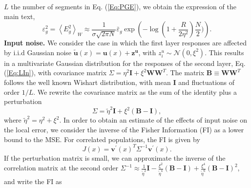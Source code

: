 \documentclass[a4paper]{article}%
\begin{document}
$L$ the number of segments in Eq. (\ref{Eq:PGE}), we obtain the expression of
the main text,
\begin{equation}
\varepsilon_{g}^{2} = \left\langle E_{g}^{2}\right\rangle _{W} \approx\frac{1
}{\sigma\sqrt{2\pi N}}\bar{\varepsilon}_{g} \exp{\left(  -\log\left(  1 +
\frac{R} {2\eta^{2}}\right)  \frac{N}{2} )\right)  }.
\end{equation}
\newline\newline\textbf{Input noise.} We consider the case in which the first
layer responses are affected by i.i.d Gaussian noise $\mathbf{\tilde u}(x) =
\mathbf{u}(x) + \mathbf{z^{u}} $, with $z^{u}_{i} \sim\mathcal{N}(0,\xi^{2})$.
This results in a multivariate Gaussian distribution for the responses of the
second layer, Eq. (\ref{Eq:LIn}), with covariance matrix $\Sigma= \eta^{2}
\mathbf{I} + \xi^{2} \mathbf{W} \mathbf{W}^{T}.$ The matrix $\mathbf{B}%
\equiv\mathbf{W}\mathbf{W}^{T}$ follows the well known Wishart distribution,
with mean $\mathbf{I}$ and fluctuations of order $1/L$. We rewrite the
covariance matrix as the sum of the identity plus a perturbation
\begin{equation}
\Sigma= \tilde\eta^{2} \mathbf{I} + \xi^{2}(\mathbf{B -I}),
\end{equation}
where $\tilde\eta^{2} = \eta^{2} + \xi^{2} $. In order to obtain an estimate
of the effects of input noise on the local error, we consider the inverse of
the Fisher Information (FI) as a lower bound to the MSE. For correlated
populations, the FI is given by \cite{Shamir2006ImplicationsCoding}
\begin{equation}
J(x) = \mathbf{v^{\prime}}(x)^{T} \Sigma^{-1}\mathbf{v^{\prime}}(x).
\end{equation}
If the perturbation matrix is small, we can approximate the inverse of the
correlation matrix at the second order \newline$\Sigma^{-1} \approx\frac
{1}{\tilde\eta^{2}} \mathbf{I} - \frac{\xi^{2}}{\tilde\eta^{4}} \left(
\mathbf{B}-\mathbf{I}\right)  + \frac{\xi^{4}} {\tilde\eta^{6}}\left(
\mathbf{B}-\mathbf{I}\right)  ^{2} $, and write the FI as%
\end{document}
